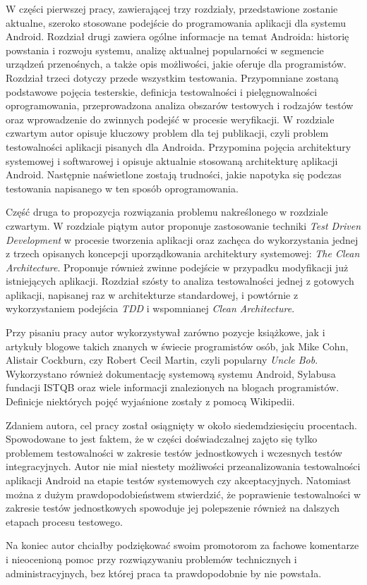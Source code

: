 W części pierwszej pracy, zawierającej trzy rozdziały, przedstawione zostanie aktualne, szeroko stosowane podejście do programowania aplikacji dla systemu Android. Rozdział drugi zawiera ogólne informacje na temat Androida: historię powstania i rozwoju systemu, analizę aktualnej popularności w segmencie urządzeń przenośnych, a także opis możliwości, jakie oferuje dla programistów. Rozdział trzeci dotyczy przede wszystkim testowania. Przypomniane zostaną podstawowe pojęcia testerskie, definicja testowalności i pielęgnowalności oprogramowania, przeprowadzona analiza obszarów testowych i rodzajów testów oraz wprowadzenie do zwinnych podejść w procesie weryfikacji. W rozdziale czwartym autor opisuje kluczowy problem dla tej publikacji, czyli problem testowalności aplikacji pisanych dla Androida. Przypomina pojęcia architektury systemowej i softwarowej i opisuje aktualnie stosowaną architekturę aplikacji Android. Następnie naświetlone zostają trudności, jakie napotyka się podczas testowania napisanego w ten sposób oprogramowania.

Część druga to propozycja rozwiązania problemu nakreślonego w rozdziale czwartym. W rozdziale piątym autor proponuje zastosowanie techniki \textit{Test Driven Development} w procesie tworzenia aplikacji oraz zachęca do wykorzystania jednej z trzech opisanych koncepcji uporządkowania architektury systemowej: \textit{The Clean Architecture}. Proponuje również zwinne podejście w przypadku modyfikacji już istniejących aplikacji. Rozdział szósty to analiza testowalności jednej z gotowych aplikacji, napisanej raz w architekturze standardowej, i powtórnie z wykorzystaniem podejścia \textit{TDD} i wspomnianej \textit{Clean Architecture}.

Przy pisaniu pracy autor wykorzystywał zarówno pozycje książkowe, jak i artykuły blogowe takich znanych w świecie programistów osób, jak Mike Cohn, Alistair Cockburn, czy Robert Cecil Martin, czyli popularny \textit{Uncle Bob}. Wykorzystano również dokumentację systemową systemu Android, Sylabusa fundacji ISTQB oraz wiele informacji znalezionych na blogach programistów. Definicje niektórych pojęć wyjaśnione zostały z pomocą Wikipedii. 

Zdaniem autora, cel pracy został osiągnięty w około siedemdziesięciu procentach. Spowodowane to jest faktem, że w części doświadczalnej zajęto się tylko problemem testowalności w zakresie testów jednostkowych i wczesnych testów integracyjnych. Autor nie miał niestety możliwości przeanalizowania testowalności aplikacji Android na etapie testów systemowych czy akceptacyjnych. Natomiast można z dużym prawdopodobieństwem stwierdzić, że poprawienie testowalności w zakresie testów jednostkowych spowoduje jej polepszenie również na dalszych etapach procesu testowego.

Na koniec autor chciałby podziękować swoim promotorom za fachowe komentarze i nieocenioną pomoc przy rozwiązywaniu problemów technicznych i administracyjnych, bez której praca ta prawdopodobnie by nie powstała.


